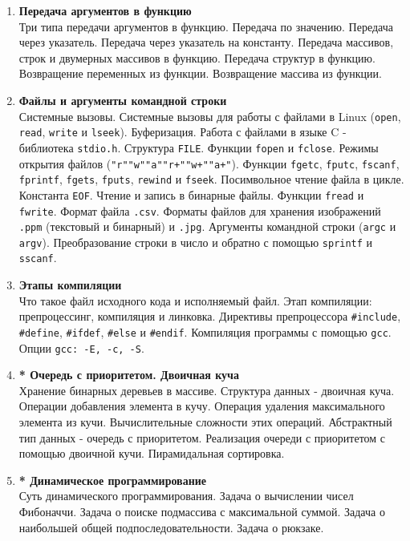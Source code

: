 \documentclass{article}
\begin{document}
\begin{enumerate}
\item \textbf{Передача аргументов в функцию}\\
Три типа передачи аргументов в функцию. Передача по значению. Передача через указатель. Передача через указатель на константу. Передача массивов, строк и двумерных массивов в функцию. Передача структур в функцию. Возвращение переменных из функции. Возвращение массива из функции.


\item \textbf{Файлы и аргументы командной строки}\\
Системные вызовы. Системные вызовы для работы с файлами в Linux (\texttt{open}, \texttt{read}, \texttt{write} и \texttt{lseek}). Буферизация. Работа с файлами в языке C - библиотека \texttt{stdio.h}. Структура \texttt{FILE}. Функции \texttt{fopen} и \texttt{fclose}. Режимы открытия файлов (\texttt{"r"\quad "w"\quad "a"\quad "r+"\quad "w+"\quad "a+"}). Функции \texttt{fgetc}, \texttt{fputc}, \texttt{fscanf}, \texttt{fprintf}, \texttt{fgets}, \texttt{fputs}, \texttt{rewind} и \texttt{fseek}. Посимвольное чтение файла в цикле. Константа \texttt{EOF}. Чтение и запись в бинарные файлы. Функции \texttt{fread} и \texttt{fwrite}. Формат файла \texttt{.csv}. Форматы файлов для хранения изображений \texttt{.ppm} (текстовый и бинарный) и \texttt{.jpg}. Аргументы командной строки (\texttt{argc} и \texttt{argv}). Преобразование строки в число и обратно с помощью \texttt{sprintf} и \texttt{sscanf}.


\item \textbf{Этапы компиляции}\\
Что такое файл исходного кода и исполняемый файл. Этап компиляции: препроцессинг, компиляция и линковка. Директивы препроцессора \texttt{\#include}, \texttt{\#define}, \texttt{\#ifdef}, \texttt{\#else} и \texttt{\#endif}. Компиляция программы с помощью \texttt{gcc}. Опции \texttt{gcc: -E, -c, -S}.


\item \textbf{* Очередь с приоритетом. Двоичная куча}\\
Хранение бинарных деревьев в массиве. Структура данных - двоичная куча. Операции добавления элемента в кучу. Операция удаления максимального элемента из кучи. Вычислительные сложности этих операций. Абстрактный тип данных - очередь с приоритетом. Реализация очереди с приоритетом с помощью двоичной кучи. Пирамидальная сортировка.

\item \textbf{* Динамическое программирование}\\
Суть динамического программирования. Задача о вычислении чисел Фибоначчи. Задача о поиске подмассива с максимальной суммой. Задача о наибольшей общей подпоследовательности. Задача о рюкзаке. 

\end{enumerate}
\end{document}
